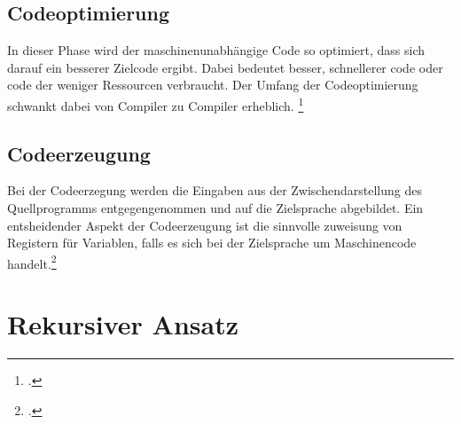 \subsection{Codeoptimierung}
In dieser Phase wird der maschinenunabhängige Code so optimiert, dass sich darauf ein besserer Zielcode ergibt. Dabei bedeutet besser, schnellerer code oder code der weniger Ressourcen verbraucht. Der Umfang der Codeoptimierung schwankt dabei von Compiler zu Compiler erheblich.  \footcite[Vgl.][S. 11f]{Ullmann2008}
\subsection{Codeerzeugung}
Bei der Codeerzegung werden die Eingaben aus der Zwischendarstellung des Quellprogramms entgegengenommen und auf die Zielsprache abgebildet. Ein entsheidender Aspekt der Codeerzeugung ist die sinnvolle zuweisung von Registern für Variablen, falls es sich bei der Zielsprache um Maschinencode handelt.\footcite[Vgl.][S. 13]{Ullmann2008}

\section{Rekursiver Ansatz}